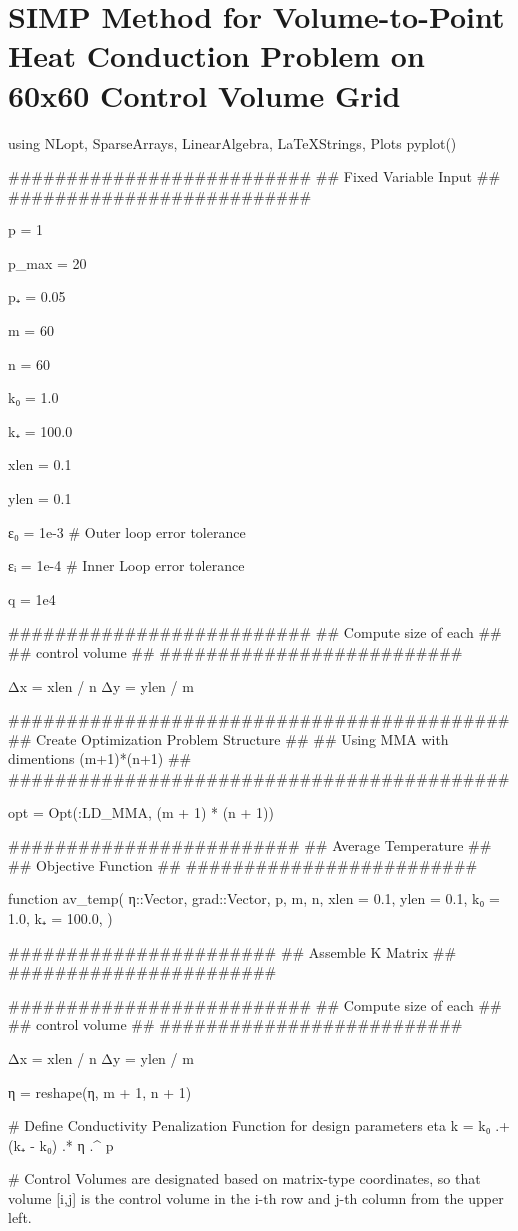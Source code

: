 \section{SIMP Method for Volume-to-Point Heat Conduction Problem on 60x60 Control Volume Grid}\label{sec:SIMP-Alg}
\begin{jllisting}
using NLopt, SparseArrays, LinearAlgebra, LaTeXStrings, Plots
pyplot()

##########################
## Fixed Variable Input ##
##########################

p = 1

p_max = 20

p₊ = 0.05

m = 60

n = 60

k₀ = 1.0

k₊ = 100.0

xlen = 0.1

ylen = 0.1

ε₀ = 1e-3 # Outer loop error tolerance

εᵢ = 1e-4 # Inner Loop error tolerance

q = 1e4

##########################
## Compute size of each ##
##   control volume     ##
##########################

Δx = xlen / n
Δy = ylen / m

###########################################
## Create Optimization Problem Structure ##
## Using MMA with dimentions (m+1)*(n+1) ##
###########################################

opt = Opt(:LD_MMA, (m + 1) * (n + 1))

#########################
## Average Temperature ##
## Objective Function  ##
#########################

function av_temp(
	η::Vector,
	grad::Vector,
	p,
	m,
	n,
	xlen = 0.1,
	ylen = 0.1,
	k₀ = 1.0,
	k₊ = 100.0,
)

	#######################
	## Assemble K Matrix ##
	#######################

	##########################
	## Compute size of each ##
	##   control volume     ##
	##########################

	Δx = xlen / n
	Δy = ylen / m

	η = reshape(η, m + 1, n + 1)

	# Define Conductivity Penalization Function for design parameters eta
	k = k₀ .+ (k₊ - k₀) .* η .^ p

	# Control Volumes are designated based on matrix-type coordinates, so that volume [i,j] is the control volume in the i-th row and j-th column from the upper left.


\end{jllisting}
